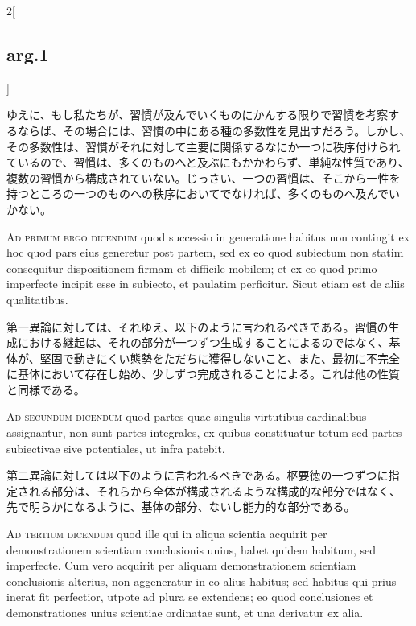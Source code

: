 \documentclass[paper=a4paper,fontsize=10pt,jafontsize=9pt,titlepage]{jlreq}
\begin{document}
\begin{paracol}{2}[\subsection{arg.1}]
\switchcolumn

ゆえに、もし私たちが、習慣が及んでいくものにかんする限りで習慣を考察す
るならば、その場合には、習慣の中にある種の多数性を見出すだろう。しかし、
その多数性は、習慣がそれに対して主要に関係するなにか一つに秩序付けられ
ているので、習慣は、多くのものへと及ぶにもかかわらず、単純な性質であり、
複数の習慣から構成されていない。じっさい、一つの習慣は、そこから一性を
持つところの一つのものへの秩序においてでなければ、多くのものへ及んでい
かない。

\switchcolumn*[\subsection{ad.1}]

{\scshape Ad primum ergo dicendum} quod successio in generatione
habitus non contingit ex hoc quod pars eius generetur post partem, sed
ex eo quod subiectum non statim consequitur dispositionem firmam et
difficile mobilem; et ex eo quod primo imperfecte incipit esse in
subiecto, et paulatim perficitur. Sicut etiam est de aliis
qualitatibus.

\switchcolumn

第一異論に対しては、それゆえ、以下のように言われるべきである。習慣の生
成における継起は、それの部分が一つずつ生成することによるのではなく、基
体が、堅固で動きにくい態勢をただちに獲得しないこと、また、最初に不完全
に基体において存在し始め、少しずつ完成されることによる。これは他の性質
と同様である。

\switchcolumn*[\subsection{ad.2}]

{\scshape Ad secundum dicendum} quod partes quae singulis virtutibus
cardinalibus assignantur, non sunt partes integrales, ex quibus
constituatur totum sed partes subiectivae sive potentiales, ut infra
patebit.

\switchcolumn

第二異論に対しては以下のように言われるべきである。枢要徳の一つずつに指
定される部分は、それらから全体が構成されるような構成的な部分ではなく、
先で明らかになるように、基体の部分、ないし能力的な部分である。

\switchcolumn*[\subsection{ad.3}]

{\scshape Ad tertium dicendum} quod ille qui in aliqua scientia
acquirit per demonstrationem scientiam conclusionis unius, habet
quidem habitum, sed imperfecte. Cum vero acquirit per aliquam
demonstrationem scientiam conclusionis alterius, non aggeneratur in eo
alius habitus; sed habitus qui prius inerat fit perfectior, utpote ad
plura se extendens; eo quod conclusiones et demonstrationes unius
scientiae ordinatae sunt, et una derivatur ex alia.


\end{paracol}
\end{document}
